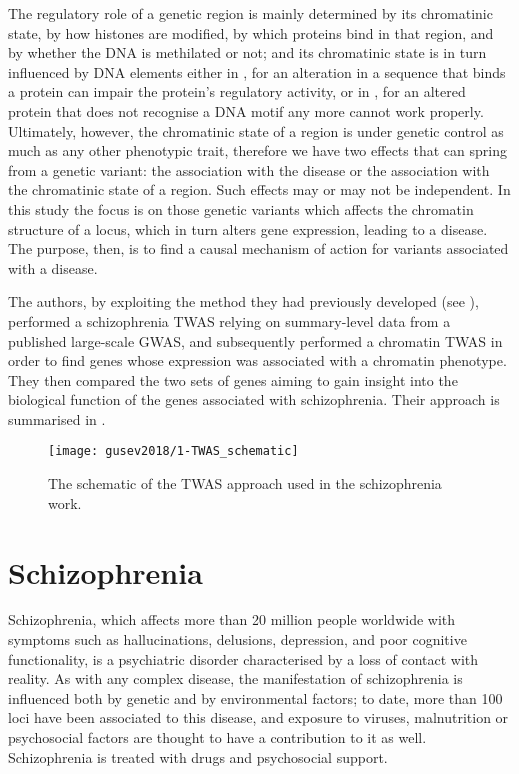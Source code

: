 \documentclass[../main.tex]{subfiles}
\begin{document}
The regulatory role of a genetic region is mainly determined by its 
chromatinic state, \ie by how histones are modified, by which proteins 
bind in that region, and by whether the DNA is methilated or not; and 
its chromatinic state is in turn influenced by DNA elements either in 
\cis, for an alteration in a sequence that binds a protein can impair 
the protein's regulatory activity, or in \trans, for an altered protein 
that does not recognise a DNA motif any more cannot work properly. 
Ultimately, however, the chromatinic state of a region is under genetic 
control as much as any other phenotypic trait, therefore we have two 
effects that can spring from a genetic variant: the association with the 
disease or the association with the chromatinic state of a region. Such 
effects may or may not be independent. In this study the focus is on 
those genetic variants which affects the chromatin structure of a locus, 
which in turn alters gene expression, leading to a disease. The purpose, 
then, is to find a causal mechanism of action for variants associated 
with a disease.

The authors, by exploiting the method they had previously developed (see 
), performed a schizophrenia TWAS relying on 
summary-level data from a published large-scale GWAS, and subsequently 
performed a chromatin TWAS in order to find genes whose expression was 
associated with a chromatin phenotype. They then compared the two sets 
of genes aiming to gain insight into the biological function of the 
genes associated with schizophrenia. Their approach is summarised in 
.

\begin{figure}
	\texttt{[image: gusev2018/1-TWAS\_schematic]}
	\caption{The schematic of the TWAS approach used in the 
schizophrenia work.}
\end{figure}

\section{Schizophrenia}

Schizophrenia, which affects more than 20 million people worldwide with 
symptoms such as hallucinations, delusions, depression, and poor 
cognitive functionality, is a psychiatric disorder characterised by a 
loss of contact with 
reality\cite{https://www.nimh.nih.gov/health/topics/schizophrenia/index.shtml}. 
As with any complex disease, the manifestation of schizophrenia is 
influenced both by genetic and by environmental factors; to date, more 
than 100 loci have been associated to this disease, and exposure to 
viruses, malnutrition or psychosocial factors are thought to have a 
contribution to it as well. Schizophrenia is treated with drugs and 
psychosocial support.
\end{document}
